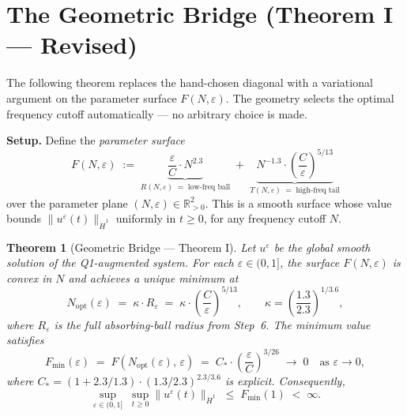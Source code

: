 \documentclass[11pt]{article}
\newtheorem{theorem}{Theorem}[section]
\begin{document}


\section{The Geometric Bridge (Theorem I — Revised)}

\noindent
The following theorem replaces the hand-chosen diagonal with a
variational argument on the parameter surface $F(N,\varepsilon)$.
The geometry selects the optimal frequency cutoff automatically ---
no arbitrary choice is made.

\medskip

\noindent
\textbf{Setup.}
Define the \emph{parameter surface}
\[
  F(N,\varepsilon)
  \;:=\;
  \underbrace{\frac{\varepsilon}{C}\cdot N^{2.3}}_{R(N,\varepsilon)\;=\;\text{low-freq ball}}
  \;+\;
  \underbrace{N^{-1.3}\cdot\!\left(\frac{C}{\varepsilon}\right)^{\!5/13}}_{T(N,\varepsilon)\;=\;\text{high-freq tail}}
\]
over the parameter plane $(N,\varepsilon)\in\mathbb{R}_{>0}^2$.
This is a smooth surface whose value bounds
$\|u^\varepsilon(t)\|_{\dot{H}^1}$ uniformly in $t\geq 0$,
for any frequency cutoff $N$.

\begin{theorem}[Geometric Bridge --- Theorem I]
\label{thm:geom_bridge}
Let $u^\varepsilon$ be the global smooth solution of the Q1-augmented
system.  For each $\varepsilon\in(0,1]$, the surface $F(N,\varepsilon)$
is convex in $N$ and achieves a unique minimum at
\[
  N_{\mathrm{opt}}(\varepsilon)
  \;=\; \kappa\cdot R_\varepsilon
  \;=\; \kappa\cdot\left(\frac{C}{\varepsilon}\right)^{\!5/13},
  \qquad \kappa = \left(\frac{1.3}{2.3}\right)^{\!1/3.6},
\]
where $R_\varepsilon$ is the full absorbing-ball radius from Step~6.
The minimum value satisfies
\[
  F_{\min}(\varepsilon)
  \;=\; F\!\left(N_{\mathrm{opt}}(\varepsilon),\,\varepsilon\right)
  \;=\; C_*\cdot\left(\frac{\varepsilon}{C}\right)^{\!3/26}
  \;\to\; 0
  \quad\text{as }\varepsilon\to 0,
\]
where $C_* = (1+2.3/1.3)\cdot(1.3/2.3)^{2.3/3.6}$ is explicit.
Consequently,
\[
  \sup_{\varepsilon\in(0,1]}\;\sup_{t\geq 0}
  \|u^\varepsilon(t)\|_{\dot{H}^1}
  \;\leq\; F_{\min}(1) \;<\; \infty.
\]
\end{theorem}
\end{document}

